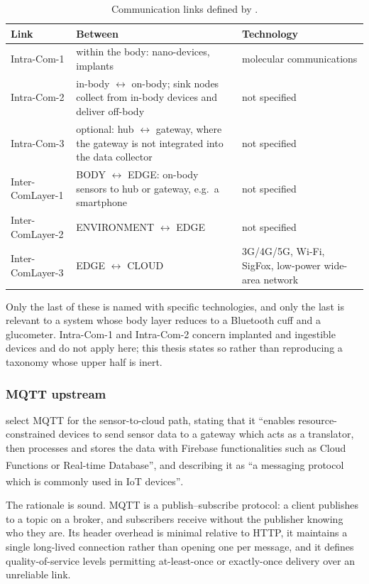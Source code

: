 \documentclass[12pt,a4paper,oneside]{report}
\newcommand{\bq}[1]{``#1''\textsuperscript{\dag}}
\begin{document}
\begin{table}[htbp]
\centering\footnotesize
\caption{Communication links defined by \textcite{mucchi2021}.}\label{tab:comm-links}
\begin{tabularx}{\textwidth}{@{}>{\raggedright\arraybackslash}p{3.0cm} X >{\raggedright\arraybackslash}p{4.1cm}@{}}
\toprule
\textbf{Link} & \textbf{Between} & \textbf{Technology} \\
\midrule
Intra-Com-1 & within the body: nano-devices, implants & molecular communications \\
Intra-Com-2 & in-body $\leftrightarrow$ on-body; sink nodes collect from in-body devices and deliver off-body & not specified \\
Intra-Com-3 & optional: hub $\leftrightarrow$ gateway, where the gateway is not integrated into the data collector & not specified \\
Inter-ComLayer-1 & BODY $\leftrightarrow$ EDGE: on-body sensors to hub or gateway, e.g.\ a smartphone & not specified \\
Inter-ComLayer-2 & ENVIRONMENT $\leftrightarrow$ EDGE & not specified \\
Inter-ComLayer-3 & EDGE $\leftrightarrow$ CLOUD & 3G/4G/5G, Wi-Fi, SigFox, low-power wide-area network \\
\bottomrule
\end{tabularx}
\end{table}

Only the last of these is named with specific technologies, and only the last is relevant to a system whose body layer reduces to a Bluetooth cuff and a glucometer. Intra-Com-1 and Intra-Com-2 concern implanted and ingestible devices and do not apply here; this thesis states so rather than reproducing a taxonomy whose upper half is inert.

\subsubsection{MQTT upstream}

\Textcite{efendi2025} select MQTT for the sensor-to-cloud path, stating that it \bq{enables resource-constrained devices to send sensor data to a gateway which acts as a translator, then processes and stores the data with Firebase functionalities such as Cloud Functions or Real-time Database}, and describing it as \bq{a messaging protocol which is commonly used in IoT devices}.

The rationale is sound. MQTT is a publish--subscribe protocol: a client publishes to a topic on a broker, and subscribers receive without the publisher knowing who they are. Its header overhead is minimal relative to HTTP, it maintains a single long-lived connection rather than opening one per message, and it defines quality-of-service levels permitting at-least-once or exactly-once delivery over an unreliable link.
\end{document}
